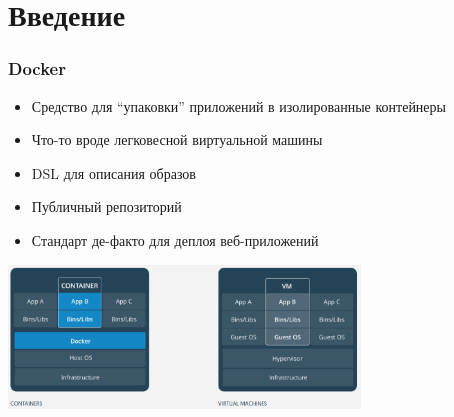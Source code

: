 \documentclass{../../slides-style}
\begin{document}
    \begin{frame}[plain]
        \titlepage
    \end{frame}

    \section{Введение}

    \begin{frame}
        \frametitle{Docker}
        \begin{itemize}
            \item Средство для \enquote{упаковки} приложений в изолированные контейнеры
            \item Что-то вроде легковесной виртуальной машины
            \item DSL для описания образов 
            \item Публичный репозиторий
            \item Стандарт де-факто для деплоя веб-приложений
        \end{itemize}
        \begin{center}
            \includegraphics[width=0.7\textwidth]{docker.png}
        \end{center}
    \end{frame}
\end{document}
